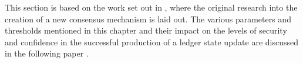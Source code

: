 This section is based on the work set out in \cite{catalystresearch}, where the original research into the creation of a new consensus mechanism is laid out. The various parameters and thresholds mentioned in this chapter and their impact on the levels of security and confidence in the successful production of a ledger state update are discussed in the following paper \cite{catalystresearch2}.
